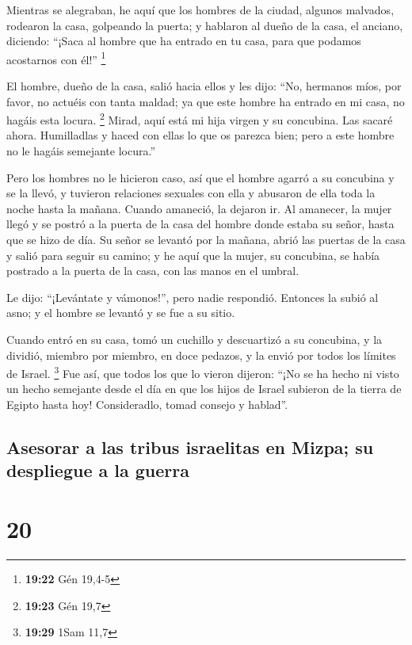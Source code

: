 Mientras se alegraban, he aquí que los hombres de la
ciudad, algunos malvados, rodearon la casa, golpeando la puerta; y
hablaron al dueño de la casa, el anciano, diciendo: ``¡Saca al hombre
que ha entrado en tu casa, para que podamos acostarnos con él!''
\footnote{\textbf{19:22} Gén 19,4-5}

 El hombre, dueño de la casa, salió hacia ellos y les
dijo: ``No, hermanos míos, por favor, no actuéis con tanta maldad; ya
que este hombre ha entrado en mi casa, no hagáis esta locura.
\footnote{\textbf{19:23} Gén 19,7}  Mirad, aquí está mi
hija virgen y su concubina. Las sacaré ahora. Humilladlas y haced con
ellas lo que os parezca bien; pero a este hombre no le hagáis semejante
locura.''

 Pero los hombres no le hicieron caso, así que el hombre
agarró a su concubina y se la llevó, y tuvieron relaciones sexuales con
ella y abusaron de ella toda la noche hasta la mañana. Cuando amaneció,
la dejaron ir.  Al amanecer, la mujer llegó y se postró a
la puerta de la casa del hombre donde estaba su señor, hasta que se hizo
de día.  Su señor se levantó por la mañana, abrió las
puertas de la casa y salió para seguir su camino; y he aquí que la
mujer, su concubina, se había postrado a la puerta de la casa, con las
manos en el umbral.

 Le dijo: ``¡Levántate y vámonos!'', pero nadie
respondió. Entonces la subió al asno; y el hombre se levantó y se fue a
su sitio.

 Cuando entró en su casa, tomó un cuchillo y descuartizó
a su concubina, y la dividió, miembro por miembro, en doce pedazos, y la
envió por todos los límites de Israel. \footnote{\textbf{19:29} 1Sam
  11,7}  Fue así, que todos los que lo vieron dijeron:
``¡No se ha hecho ni visto un hecho semejante desde el día en que los
hijos de Israel subieron de la tierra de Egipto hasta hoy! Consideradlo,
tomad consejo y hablad''.

\hypertarget{asesorar-a-las-tribus-israelitas-en-mizpa-su-despliegue-a-la-guerra}{%
\subsection{Asesorar a las tribus israelitas en Mizpa; su despliegue a
la
guerra}\label{asesorar-a-las-tribus-israelitas-en-mizpa-su-despliegue-a-la-guerra}}

\hypertarget{section-19}{%
\section{20}\label{section-19}}

